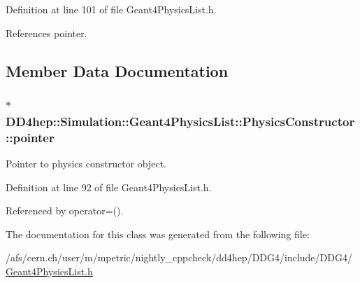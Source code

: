 Definition at line 101 of file Geant4PhysicsList.h.

References pointer.

\subsection{Member Data Documentation}
\hypertarget{class_d_d4hep_1_1_simulation_1_1_geant4_physics_list_1_1_physics_constructor_a30d7b232e1e35f1eb610c375a9e9e774}{
\subsubsection[{pointer}]{$\ast$ {\bf DD4hep::Simulation::Geant4PhysicsList::PhysicsConstructor::pointer}}}
\label{class_d_d4hep_1_1_simulation_1_1_geant4_physics_list_1_1_physics_constructor_a30d7b232e1e35f1eb610c375a9e9e774}


Pointer to physics constructor object. 

Definition at line 92 of file Geant4PhysicsList.h.

Referenced by operator=().

The documentation for this class was generated from the following file:\begin{DoxyCompactItemize}
\item 
/afs/cern.ch/user/m/mpetric/nightly\_\-cppcheck/dd4hep/DDG4/include/DDG4/\hyperlink{_geant4_physics_list_8h}{Geant4PhysicsList.h}\end{DoxyCompactItemize}

